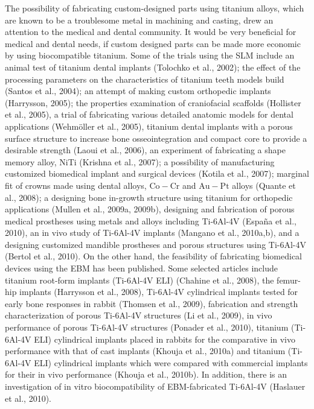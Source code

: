 \documentclass[10pt]{article}
\begin{document}
The possibility of fabricating custom-designed parts using titanium alloys, which are known to be a troublesome metal in machining and casting, drew an attention to the medical and dental community. It would be very beneficial for medical and dental needs, if custom designed parts can be made more economic by using biocompatible titanium. Some of the trials using the SLM include an animal test of titanium dental implants (Tolochko et al., 2002); the effect of the processing parameters on the characteristics of titanium teeth models build (Santos et al., 2004); an attempt of making custom orthopedic implants (Harrysson, 2005); the properties examination of craniofacial scaffolds (Hollister et al., 2005), a trial of fabricating various detailed anatomic models for dental applications (Wehmöller et al., 2005), titanium dental implants with a porous surface structure to increase bone osseointegration and compact core to provide a desirable strength (Laoui et al., 2006), an experiment of fabricating a shape memory alloy, NiTi (Krishna et al., 2007); a possibility of manufacturing customized biomedical implant and surgical devices (Kotila et al., 2007); marginal fit of crowns made using dental alloys, $\mathrm{Co}-\mathrm{Cr}$ and $\mathrm{Au}-\mathrm{Pt}$ alloys (Quante et al., 2008); a designing bone in-growth structure using titanium for orthopedic applications (Mullen et al., 2009a, 2009b), designing and fabrication of porous medical prostheses using metals and alloys including Ti-6Al-4V (España et al., 2010), an in vivo study of Ti-6Al-4V implants (Mangano et al., 2010a,b), and a designing customized mandible prostheses and porous structures using Ti-6Al-4V (Bertol et al., 2010). On the other hand, the feasibility of fabricating biomedical devices using the EBM has been published. Some selected articles include titanium root-form implants (Ti-6Al-4V ELI) (Chahine et al., 2008), the femur-hip implants (Harrysson et al., 2008), Ti-6Al-4V cylindrical implants tested for early bone responses in rabbit (Thomsen et al., 2009), fabrication and strength characterization of porous Ti-6Al-4V structures (Li et al., 2009), in vivo performance of porous Ti-6Al-4V structures (Ponader et al., 2010), titanium (Ti-6Al-4V ELI) cylindrical implants placed in rabbits for the comparative in vivo performance with that of cast implants (Khouja et al., 2010a) and titanium (Ti-6Al-4V ELI) cylindrical implants which were compared with commercial implants for their in vivo performance (Khouja et al., 2010b). In addition, there is an investigation of in vitro biocompatibility of EBM-fabricated Ti-6Al-4V (Haslauer et al., 2010).
\end{document}

